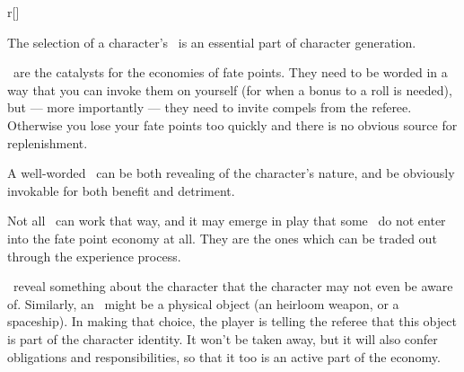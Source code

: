 \begin{wrapfigure}[28]{r}[\sidebarwidth]{\halfbarwidth}%
\colorbox{sbbackground}{\begin{minipage}{\halfbarinnerwidth}%
%
The selection of a character's \Aspects\ is an essential part of character 
generation.

\Aspects\ are the catalysts for the economies of fate points. They need to be 
worded in a way that you can invoke them on yourself (for when a bonus to a 
roll is needed), but --- more importantly --- they need to invite compels from 
the referee. Otherwise you lose your fate points too quickly and there is no 
obvious source for replenishment.

A well-worded \Aspect\ can be both revealing of the character's nature, and be 
obviously invokable for both benefit and detriment.

Not all \Aspects\ can work that way, and it may emerge in play that some 
\Aspects\ do not enter into the fate point economy at all. They are the ones 
which can be traded out through the experience process.

\Aspects\ reveal something about the character that the character may not even 
be aware of. Similarly, an \Aspect\ might be a physical object (an heirloom 
weapon, or a spaceship). In making that choice, the player is telling the 
referee that this object is part of the character identity. It won't be taken 
away, but it will also confer obligations and responsibilities, so that it too 
is an active part of the economy.
\end{minipage}}
\end{wrapfigure}
